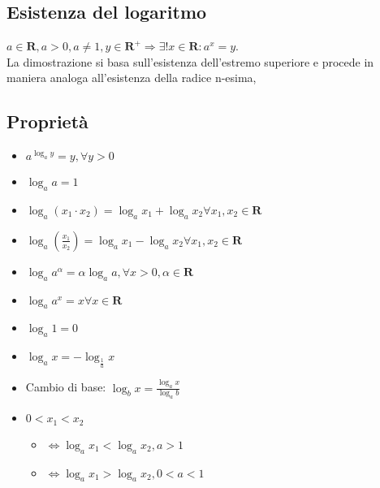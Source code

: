 \subsection{Esistenza del logaritmo}
$a\in \mathbf{R}, a>0, a\neq 1, y\in \mathbf{R^+}\Rightarrow\exists!x\in\mathbf{R}:a^x=y$.\\
La dimostrazione si basa sull'esistenza dell'estremo superiore e procede in maniera analoga all'esistenza della radice n-esima,
\subsection{Propriet\`a}
\begin{itemize}
\item $a^{\log_a y}=y,\forall y>0$
\item $\log_a a =1$
\item $\log_a(x_1\cdot x_2)=\log_a x_1 + \log_a x_2 \forall x_1, x_2 \in \mathbf{R}$
\item $\log_a(\frac{x_1}{x_2})=\log_a x_1 - \log_a x_2 \forall x_1, x_2 \in \mathbf{R}$
\item $\log_a a^{\alpha} =\alpha\log_a a, \forall x>0, \alpha \in \mathbf{R}$
\item $\log_a a^x =x \forall x\in \mathbf{R}$
\item $\log_a 1 =0$
\item $\log_a x =-\log_{\frac{1}{a}} x$
\item Cambio di base: $\log_b x=\frac{\log_a x}{\log_a b}$
\item $0<x_1<x_2$
\begin{itemize}
\item $\Leftrightarrow \log_a x_1<\log_a x_2, a>1$
\item $\Leftrightarrow \log_a x_1>\log_a x_2, 0<a<1$
\end{itemize}
\end{itemize}